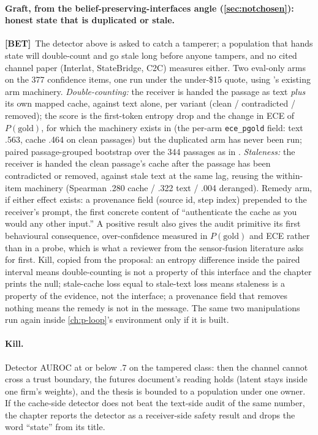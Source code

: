 \documentclass[11pt,a4paper]{report}
\newcommand{\BET}{\textcolor{betc}{\textbf{\scriptsize[BET]}}}
\begin{document}
\paragraph{Graft, from the belief-preserving-interfaces angle (\cref{sec:notchosen}): honest state that is duplicated or stale.} \BET\ The detector above is asked to catch a tamperer; a population that hands state will double-count and go stale long before anyone tampers, and no cited channel paper (Interlat, StateBridge, C2C) measures either. Two eval-only arms on the 377 confidence items, one run under the under-\$15 quote, using 's existing arm machinery. \emph{Double-counting:} the receiver is handed the passage as text \emph{plus} its own mapped cache, against text alone, per variant (clean / contradicted / removed); the score is the first-token entropy drop and the change in ECE of $P(\text{gold})$, for which the machinery exists in  (the per-arm \texttt{ece\_pgold} field: text .563, cache .464 on clean passages) but the duplicated arm has never been run; paired passage-grouped bootstrap over the 344 passages as in . \emph{Staleness:} the receiver is handed the clean passage's cache after the passage has been contradicted or removed, against stale text at the same lag, reusing the within-item machinery (Spearman .280 cache / .322 text / .004 deranged). Remedy arm, if either effect exists: a provenance field (source id, step index) prepended to the receiver's prompt, the first concrete content of ``authenticate the cache as you would any other input.'' A positive result also gives the audit primitive its first behavioural consequence, over-confidence measured in $P(\text{gold})$ and ECE rather than in a probe, which is what a reviewer from the sensor-fusion literature asks for first. Kill, copied from the proposal: an entropy difference inside the paired interval means double-counting is not a property of this interface and the chapter prints the null; stale-cache loss equal to stale-text loss means staleness is a property of the evidence, not the interface; a provenance field that removes nothing means the remedy is not in the message. The same two manipulations run again inside \cref{ch:p-loop}'s environment only if it is built.

\paragraph{Kill.} Detector AUROC at or below .7 on the tampered class: then the channel cannot cross a trust boundary, the futures document's reading holds (latent stays inside one firm's weights), and the thesis is bounded to a population under one owner. If the cache-side detector does not beat the text-side audit of the same number, the chapter reports the detector as a receiver-side safety result and drops the word ``state'' from its title.
\end{document}
